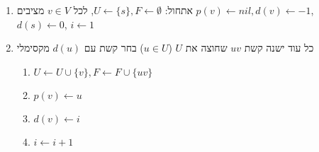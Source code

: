 \begin{enumerate}
\item
אתחול:
$U \leftarrow \{s\}, F \leftarrow \emptyset$, 
לכל 
$v \in V$
מציבים
$p(v) \leftarrow nil, d(v) \leftarrow -1$,
$d(s) \leftarrow 0$,
$i \leftarrow 1$
\item 
כל עוד ישנה קשת 
$uv$
שחוצה את $U$ 
($u \in U$)
בחר קשת עם 
$d(u)$
מקסימלי
	\begin{enumerate}
	\item
	$U \leftarrow U \cup \{v\}, F \leftarrow F \cup \{uv\}$
	\item
	$p(v) \leftarrow u$
	\item
	$d(v) \leftarrow i$
	\item
	$i \leftarrow i + 1$
	\end{enumerate}
\end{enumerate}


